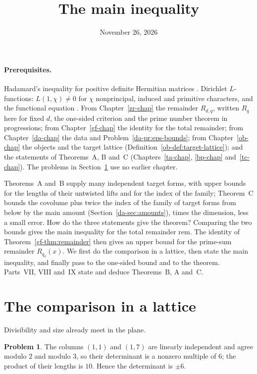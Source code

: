 \documentclass[reqno]{amsart}
\title{The main inequality}
\author{}
\date{November 26, 2026}
\newcounter{chap}
\theoremstyle{definition}
\newtheorem{problem}{Problem}[section]
\theoremstyle{plain}
\newcommand{\rem}{\mathrm{rem}}
\begin{document}
\maketitle
{}\label{chap}

\paragraph{Prerequisites.}
Hadamard's inequality for positive definite Hermitian matrices \cite[\S7.8]{HJ}.  Dirichlet \(L\)-functions: \(L(1, \chi) \ne 0\) for \(\chi\) nonprincipal, induced and primitive characters, and the functional equation \cite[Ch.~4, Ch.~5, Ch.~8, Ch.~9]{Dav}.  From Chapter~\ref{zr-chap} the remainder \(R_{d,q}\), written \(R_q\) here for fixed \(d\), the one-sided criterion and the prime number theorem in progressions; from Chapter~\ref{gf-chap} the identity for the total remainder; from Chapter~\ref{da-chap} the data and Problem~\ref{da-pr:eps-bounds}; from Chapter~\ref{ob-chap} the objects and the target lattice (Definition~\ref{ob-def:target-lattice}); and the statements of Theorems~A, B and~C (Chapters~\ref{ta-chap}, \ref{bp-chap} and~\ref{tc-chap}).  The problems in Section~\ref{sec:toy} use no earlier chapter.

\medskip
Theorems~A and~B supply many independent target forms, with upper bounds for the lengths of their untwisted lifts and for the index of the family; Theorem~C bounds the covolume plus twice the index of the family of target forms from below by the main amount (Section~\ref{da-sec:amounts}), times the dimension, less a small error.  How do the three statements give the theorem?  Comparing the two bounds gives the main inequality for the total remainder \(\rem\).  The identity of Theorem~\ref{gf-thm:remainder} then gives an upper bound for the prime-sum remainder \(R_{q_0}(x)\).  We first do the comparison in a lattice, then state the main inequality, and finally pass to the one-sided bound and to the theorem.  Parts~VII, VIII and~IX state and deduce Theorems~B, A and~C.

\section{The comparison in a lattice}\label{sec:toy}

Divisibility and size already meet in the plane.

\begin{problem}\label{pr:toy-columns}
The columns \((1, 1)\) and \((1, 7)\) are linearly independent and agree modulo \(2\) and modulo \(3\), so their determinant is a nonzero multiple of \(6\); the product of their lengths is \(10\).  Hence the determinant is \(\pm 6\).
\end{problem}
\end{document}
